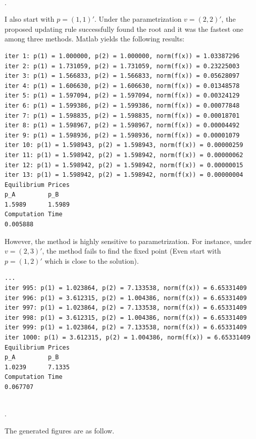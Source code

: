\documentclass[10pt, letterpaper]{article}
\begin{document}
~\\

.

\noindent I also start with $p=(1,1)'$. Under the parametrization $v=(2,2)'$, the proposed updating rule successfully found the root and it was the fastest one among three methods. Matlab yields the following results:
\begin{verbatim}
iter 1: p(1) = 1.000000, p(2) = 1.000000, norm(f(x)) = 1.03387296
iter 2: p(1) = 1.731059, p(2) = 1.731059, norm(f(x)) = 0.23225003
iter 3: p(1) = 1.566833, p(2) = 1.566833, norm(f(x)) = 0.05628097
iter 4: p(1) = 1.606630, p(2) = 1.606630, norm(f(x)) = 0.01348578
iter 5: p(1) = 1.597094, p(2) = 1.597094, norm(f(x)) = 0.00324129
iter 6: p(1) = 1.599386, p(2) = 1.599386, norm(f(x)) = 0.00077848
iter 7: p(1) = 1.598835, p(2) = 1.598835, norm(f(x)) = 0.00018701
iter 8: p(1) = 1.598967, p(2) = 1.598967, norm(f(x)) = 0.00004492
iter 9: p(1) = 1.598936, p(2) = 1.598936, norm(f(x)) = 0.00001079
iter 10: p(1) = 1.598943, p(2) = 1.598943, norm(f(x)) = 0.00000259
iter 11: p(1) = 1.598942, p(2) = 1.598942, norm(f(x)) = 0.00000062
iter 12: p(1) = 1.598942, p(2) = 1.598942, norm(f(x)) = 0.00000015
iter 13: p(1) = 1.598942, p(2) = 1.598942, norm(f(x)) = 0.00000004
Equilibrium Prices
p_A         p_B
1.5989      1.5989
Computation Time
0.005888
\end{verbatim}

\noindent However, the method is highly sensitive to parametrization. For instance, under $v=(2,3)'$, the method fails to find the fixed point (Even start with $p=(1,2)'$ which is close to the solution). 
\begin{verbatim}
...
iter 995: p(1) = 1.023864, p(2) = 7.133538, norm(f(x)) = 6.65331409
iter 996: p(1) = 3.612315, p(2) = 1.004386, norm(f(x)) = 6.65331409
iter 997: p(1) = 1.023864, p(2) = 7.133538, norm(f(x)) = 6.65331409
iter 998: p(1) = 3.612315, p(2) = 1.004386, norm(f(x)) = 6.65331409
iter 999: p(1) = 1.023864, p(2) = 7.133538, norm(f(x)) = 6.65331409
iter 1000: p(1) = 3.612315, p(2) = 1.004386, norm(f(x)) = 6.65331409
Equilibrium Prices
p_A         p_B
1.0239      7.1335
Computation Time
0.067707
\end{verbatim}


~\\


.

\noindent The generated figures are as follow.
\end{document}
